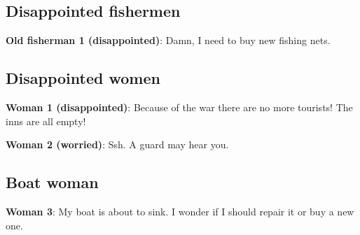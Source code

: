 \subsection{Disappointed fishermen}
\textbf{Old fisherman 1 (disappointed)}: Damn, I need to buy new fishing nets.

\subsection{Disappointed women}
\textbf{Woman 1 (disappointed)}: Because of the war there are no more tourists! The inns are all empty!

\textbf{Woman 2 (worried)}: Ssh. A guard may hear you.

\subsection{Boat woman}
\textbf{Woman 3}: My boat is about to sink. I wonder if I should repair it or buy a new one.
